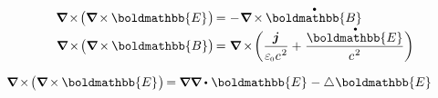\nopagebreak\begin{equation*}
\begin{array}{r@{\hspace{.3em}}c@{\hspace{.3em}}l}
\boldnabla \hspace{-0.2ex} \times \hspace{-0.3ex} \bigl( \boldnabla \hspace{-0.15ex} \times \hspace{-0.1ex} \boldmathbb{E} \hspace{.1ex} \bigr) \hspace*{-0.3ex} &
= &
- \hspace{.1ex} \boldnabla \hspace{-0.15ex} \times \hspace{-0.1ex} \mathdotabove{\boldmathbb{B}}
\\[.1em]
\boldnabla \hspace{-0.2ex} \times \hspace{-0.3ex} \bigl( \boldnabla \hspace{-0.15ex} \times \hspace{-0.1ex} \boldmathbb{B} \bigr) \hspace*{-0.3ex} &
= &
\boldnabla \hspace{-0.12ex} \times \hspace{-0.33ex} \biggl( \displaystyle \frac{\bm{j}}{\raisemath{-0.1em}{ \vacuumpermittivity \hspace{.1ex} c^{\hspace{.16ex}2} }} + \hspace{.1ex} \displaystyle \frac{\raisemath{-0.12em}{ \mathdotabove{\boldmathbb{E}} }}{\raisemath{-0.1em}{ c^{\hspace{.16ex}2} }} \biggr)
\end{array}
\end{equation*}

${\boldnabla \hspace{-0.2ex} \times \hspace{-0.3ex} \bigl( \boldnabla \hspace{-0.15ex} \times \hspace{-0.1ex} \boldmathbb{E} \hspace{.1ex} \bigr) \hspace{-0.25ex} = \hspace{-0.1ex} \boldnabla \boldnabla \dotp \hspace{.12ex} \boldmathbb{E} \hspace{.1ex} - \Laplacian \hspace{.05ex} \boldmathbb{E}}$


